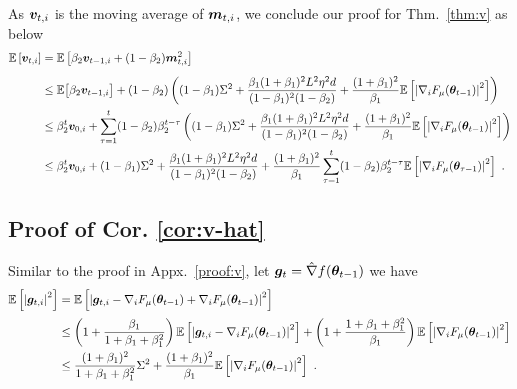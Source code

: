 \begin{appendices}
As ${\bm{v}}_{t,i}$ is the moving average of ${\bm{m}}_{t,i}$, we conclude our proof for Thm.~\ref{thm:v} as below
\begin{equation}
\begin{aligned}
\mathbb{E}\left[ {\bm{v}}_{t,i}\right]
&= \mathbb{E}\left[\beta_2 {\bm{v}}_{t-1,i} + (1-\beta_2){\bm{m}}^2_{t,i}\right] \\[5pt]
&\leq \mathbb{E}\big[\beta_2{\bm{v}}_{t-1,i}\big] + (1-\beta_2)\left((1-\beta_1) \Sigma^2 + \frac{\beta_1(1+\beta_1)^2L^2\eta^2 d}{(1 - \beta_1)^2(1 - \beta_2)} + \frac{(1+\beta_1)^2}{\beta_1} \mathbb{E}\left[\left|\nabla_i F_{\mu}({\bm{\theta}}_{t-1})\right|^2\right]\right) \\
&\leq \beta_2^{t}{\bm{v}}_{0,i} + \sum_{\tau=1}^{t}(1-\beta_2)\beta_2^{t-\tau}\left((1-\beta_1) \Sigma^2 + \frac{\beta_1(1+\beta_1)^2L^2\eta^2 d}{(1 - \beta_1)^2(1 - \beta_2)} + \frac{(1+\beta_1)^2}{\beta_1} \mathbb{E}\left[\left|\nabla_i F_{\mu}({\bm{\theta}}_{t-1})\right|^2\right]\right) \\
&\leq \beta_2^{t}{\bm{v}}_{0,i} + (1-\beta_1) \Sigma^2 + \frac{\beta_1(1+\beta_1)^2L^2\eta^2 d}{(1 - \beta_1)^2(1 - \beta_2)} + \frac{(1+\beta_1)^2}{\beta_1} \sum_{\tau=1}^{t}(1-\beta_2)\beta_2^{t-\tau}\mathbb{E}\left[\left|\nabla_i F_{\mu}({\bm{\theta}}_{\tau-1})\right|^2\right] \ . \label{eq:urov}
\end{aligned}
\end{equation}

\subsection{Proof of Cor. \ref{cor:v-hat}}\label{proof:v-hat}
Similar to the proof in Appx.~\ref{proof:v}, let ${\bm{g}}_{t} = \hat{\nabla} f({\bm{\theta}}_{t-1}) $ we have
\begin{equation}
\begin{aligned}
\mathbb{E}\left[\left|{\bm{g}}_{t,i}\right|^2\right]& = \mathbb{E}\left[\left|{\bm{g}}_{t,i} -\nabla_i F_{\mu}({\bm{\theta}}_{t-1}) + \nabla_i F_{\mu}({\bm{\theta}}_{t-1})\right|^2\right] \\[2pt]
&\leq \left(1 + \frac{\beta_1}{1 + \beta_1 + \beta_1^2}\right)\mathbb{E}\left[\left|{\bm{g}}_{t,i} - \nabla_i F_{\mu}({\bm{\theta}}_{t-1})\right|^2\right] + \left(1 + \frac{1 + \beta_1 + \beta_1^2}{\beta_1}\right)\mathbb{E}\left[\left|\nabla_i F_{\mu}({\bm{\theta}}_{t-1})\right|^2\right] \\
&\leq \frac{(1 + \beta_1)^2}{1 + \beta_1+\beta_1^2}\Sigma^2 + \frac{(1+\beta_1)^2}{\beta_1}\mathbb{E}\left[\left|\nabla_i F_{\mu}({\bm{\theta}}_{t-1})\right|^2\right] \ .
\end{aligned}
\end{equation}


\end{appendices}
